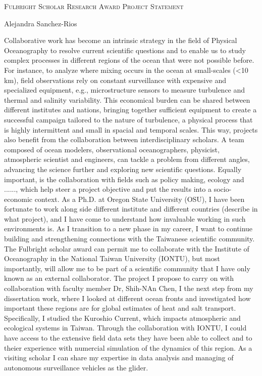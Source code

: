 \documentclass[letterpaper, 12pt ]{article}
\newcommand{\soptitle}{Fulbright Scholar Research Award Project Statement}
\newcommand{\yourname}{Alejandra Sanchez-Rios}
\begin{document}
\begin{center}{\Large \scshape \soptitle}\end{center}
\begin{center}\vspace{0.2em} { \yourname\\}
\end{center}


Collaborative work has become an intrinsic strategy in the field of Physical Oceanography to resolve current scientific questions and to enable us to study complex processes in different regions of the ocean that were not possible before. For instance, to analyze where mixing occurs in the ocean at small-scales (<10 km), field observations rely on constant surveillance with expensive and specialized equipment, e.g., microstructure sensors to measure turbulence and thermal and salinity variability. This economical burden can be shared between different institutes and nations, bringing together sufficient equipment to create a successful campaign tailored to the nature of turbulence, a physical process that is highly intermittent and small in spacial and temporal scales. This way, projects also benefit from the collaboration between interdisciplinary scholars. A team composed of ocean modelers, observational oceanographers, physicist, atmospheric scientist and engineers, can tackle a problem from different angles, advancing the science further and exploring new scientific questions. Equally important, is the collaboration with fields such as policy making, ecology and ......, which help steer a project objective and put the results into a socio-economic context. As a Ph.D. at Oregon State University (OSU), I have been fortunate to work along side different institute and different countries (describe in what project), and I have come to understand how invaluable working in such environments is. As I transition to a new phase in my career, I want to continue building and strengthening connections with the Taiwanese scientific community. The Fulbright scholar award can permit me to collaborate with the  Institute of Oceanography in the National Taiwan University (IONTU), but most importantly, will allow me to be part of a scientific community that I have only known as an external collaborator. The project I propose to carry on with collaboration with faculty member Dr, Shih-NAn Chen, I the next step from my dissertation work, where I looked at different ocean fronts and investigated how important these regions are for global estimates of heat and salt transport. Specifically, I studied the Kuroshio Current, which  impacts atmospheric and ecological systems in Taiwan. Through the collaboration with IONTU, I could have access to the extensive field data sets they have been able to collect and to theier experience with numercial simulation of the dynamics of this region. As a visiting scholar I can share my expertise in data analysis and managing of autonomous surveillance vehicles as the glider. 
\end{document}

